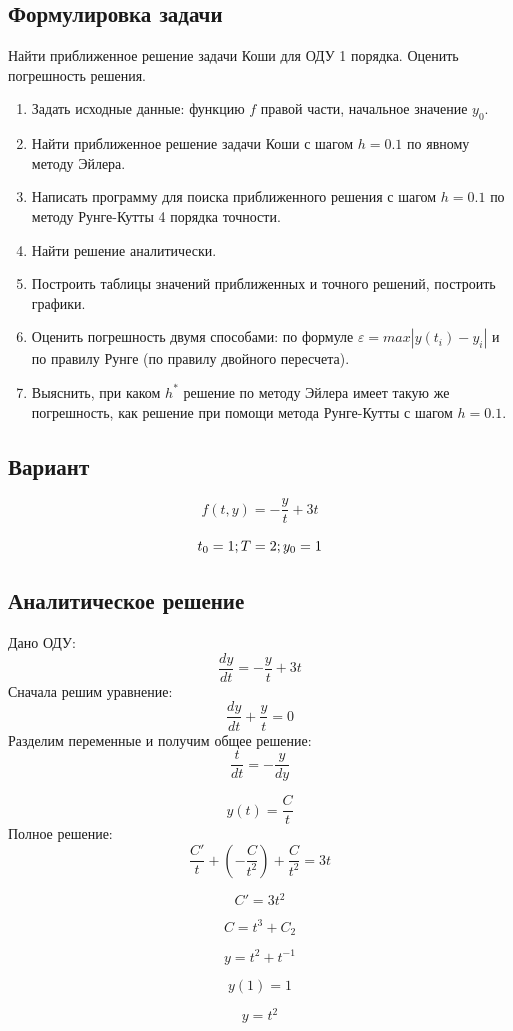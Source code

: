 \documentclass[a4paper,12pt]{article}
\begin{document}
\subsection{Формулировка задачи}
Найти приближенное решение задачи Коши для ОДУ 1 порядка. Оценить погрешность решения.
\begin{enumerate}
	\item Задать исходные данные: функцию $f$ правой части, начальное значение $y_0$.
	\item Найти приближенное решение задачи Коши с шагом $h=0.1$ по явному методу Эйлера.
	\item Написать программу для поиска приближенного решения с шагом $h=0.1$ по методу Рунге-Кутты 4 порядка точности.
	\item Найти решение аналитически.
	\item Построить таблицы значений приближенных и точного решений, построить графики.
	\item Оценить погрешность двумя способами: по формуле $\varepsilon = max|y(t_i) - y_i|$ и по правилу Рунге (по правилу двойного пересчета).
	\item Выяснить, при каком $h^*$ решение по методу Эйлера имеет такую же погрешность, как решение при помощи метода Рунге-Кутты с шагом $h=0.1$.
\end{enumerate}

\subsection{Вариант}
$$ f(t, y) = - \frac{y}{t} + 3t $$

$$ t_0 = 1; \space T = 2; \space y_0 = 1 $$

\subsection{Аналитическое решение}
Дано ОДУ:
$$ \frac{dy}{dt} = - \frac{y}{t} + 3t $$
Сначала решим уравнение:
$$ \frac{dy}{dt} + \frac{y}{t} = 0 $$ 
Разделим переменные и получим общее решение:
$$ \frac{t}{dt} = - \frac{y}{dy} $$ 

$$ y(t) = \frac{C}{t} $$ 
Полное решение:
$$ \frac{C'}{t} + (-\frac{C}{t^2}) + \frac{C}{t^2} = 3t $$

$$ C' = 3t^2 $$

$$ C = t^3 + C_2 $$

$$ y = t^2 + t^{-1} $$

$$ y(1) = 1 $$

$$ y = t^2 $$
\end{document}
